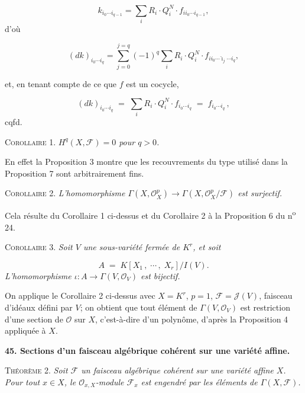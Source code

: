 \begin{equation*}
k_{i_0 \cdots i_{q-1}} = \sum_i R_i \cdot Q_i^N \cdot f_{i i_0 \cdots i_{q-1}} ,
\end{equation*}
d'où

\begin{equation*}
(dk)_{i_0 \cdots i_q} = \sum_{j=0}^{j=q} (-1)^q \sum_i R_i \cdot Q_i^N \cdot f_{i i_0 \cdots \hat{\imath}_j \cdots i_q} ,
\end{equation*}


 et, en tenant compte de ce que $f$ est un cocycle,

\begin{equation*}
(dk)_{i_0\cdots i_q} \;=\; \sum_i R_i \cdot Q_i^N \cdot f_{i_0\cdots i_q} \;=\; f_{i_0\cdots i_q} \, ,
\end{equation*}
\hfill cqfd.

\textsc{Corollaire} 1. \textit{$H^q(X, \mathcal{F}) = 0$ pour $q > 0$.}

En effet la Proposition 3 montre que les recouvrements du type utilisé dans la Proposition 7 sont arbitrairement fins.

\textsc{Corollaire} 2. \textit{L'homomorphisme $\Gamma(X, \mathcal{O}_X^p) \to \Gamma(X, \mathcal{O}_X^p/\mathcal{F})$ est surjectif.}

Cela résulte du Corollaire 1 ci-dessus et du Corollaire 2 à la Proposition 6 du n\textsuperscript{o} 24.

\textsc{Corollaire} 3. \textit{Soit $V$ une sous-variété fermée de $K^r$, et soit}

\begin{equation*}
A \;=\; K[X_1 \, , \; \cdots \, , \; X_r]/I(V).
\end{equation*}
\textit{L'homomorphisme $\iota : A \to \Gamma(V, \mathcal{O}_V)$ est bijectif.}

On applique le Corollaire 2 ci-dessus avec $X = K^r$, $p = 1$, $\mathcal{F} = \mathcal{J}(V)$, faisceau d'idéaux défini par $V$; on obtient que tout élément de $\Gamma(V, \mathcal{O}_V)$ est restriction d'une section de $\mathcal{O}$ sur $X$, c'est-à-dire d'un polynôme, d'après la Proposition 4 appliquée à $X$.


\textbf{45. Sections d'un faisceau algébrique cohérent sur une variété affine.}

\textsc{Théorème} 2. \textit{Soit $\mathcal{F}$ un faisceau algébrique cohérent sur une variété affine $X$. Pour tout $x \in X$, le $\mathcal{O}_{x,X}$-module $\mathcal{F}_x$ est engendré par les éléments de $\Gamma(X, \mathcal{F})$.}

